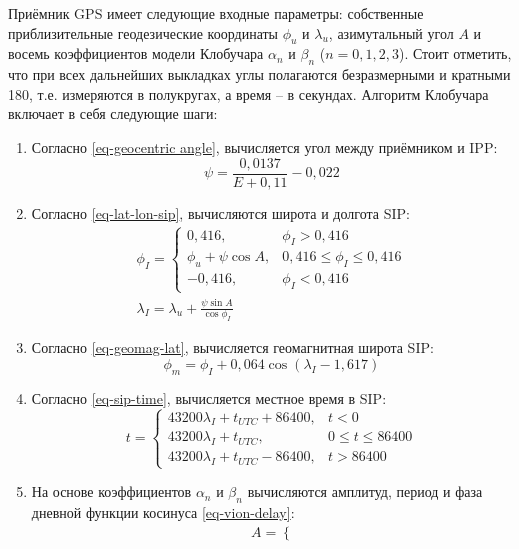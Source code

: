 Приёмник GPS имеет следующие входные параметры: собственные приблизительные геодезические координаты $\phi_u$ и $\lambda_u$, азимутальный угол $A$ и восемь коэффициентов модели Клобучара $\alpha_n$ и $\beta_n$ ($n=0,1,2,3$).
Стоит отметить, что при всех дальнейших выкладках углы полагаются безразмерными и кратными 180\degree, т.е. измеряются в полукругах, а время -- в секундах.
Алгоритм Клобучара включает в себя следующие шаги:
\begin{enumerate}
\item Согласно \eqref{eq-geocentric angle}, вычисляется угол между приёмником и IPP:
\begin{equation}
\psi=\frac{0,0137}{E+0,11}-0,022
\end{equation}
\item Согласно \eqref{eq-lat-lon-sip}, вычисляются широта и долгота SIP:
\begin{equation}
\begin{gathered}
\phi_I=\begin{cases}
0,416,&\phi_I>0,416 \\
\phi_u+\psi\cos A,&0,416\leqslant\phi_I\leqslant 0,416\\
-0,416,&\phi_I<0,416
\end{cases} \\
\lambda_I=\lambda_u+\frac{\psi\sin A}{\cos\phi_I}
\end{gathered}
\end{equation}
\item Согласно \eqref{eq-geomag-lat}, вычисляется геомагнитная широта SIP:
\begin{equation}
\phi_m=\phi_I+0,064\cos(\lambda_I-1,617)
\end{equation}
\item Согласно \eqref{eq-sip-time}, вычисляется местное время в SIP:
\begin{equation}
t=\begin{cases}
43200\lambda_I+t_{UTC}+86400,&t<0 \\
43200\lambda_I+t_{UTC},&0\leqslant t\leqslant 86400 \\
43200\lambda_I+t_{UTC}-86400,&t>86400    
\end{cases}
\end{equation}
\item На основе коэффициентов $\alpha_n$ и $\beta_n$ вычисляются амплитуд, период и фаза дневной функции косинуса \eqref{eq-vion-delay}:
\begin{equation}
\begin{aligned}
&A=\begin{cases}

\end{cases}
\end{aligned}
\end{equation}
\end{enumerate}
